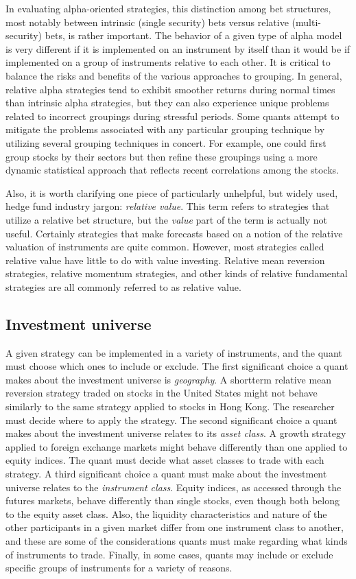\documentclass[11pt]{report}
\begin{document}
				In evaluating alpha-oriented strategies, this distinction among bet structures, most notably between intrinsic (single security) bets versus relative (multi-security) bets, is rather important. The behavior of a given type of alpha model is very different if it is implemented on an instrument by itself than it would be if implemented on a group of instruments relative to each other. It is critical to balance the risks and benefits of the various approaches to grouping. In general, relative alpha strategies tend to exhibit smoother returns during normal times than intrinsic alpha strategies, but they can also experience unique problems related to incorrect groupings during stressful periods. Some quants attempt to mitigate the problems associated with any particular grouping technique by utilizing several grouping techniques in concert. For example, one could first group stocks by their sectors but then refine these groupings using a more dynamic statistical approach that reflects recent correlations among the stocks.

				Also, it is worth clarifying one piece of particularly unhelpful, but widely used, hedge fund industry jargon: \textit{relative value}. This term refers to strategies that utilize a relative bet structure, but the \textit{value} part of the term is actually not useful. Certainly strategies that make forecasts based on a notion of the relative valuation of instruments are quite common. However, most strategies called relative value have little to do with value investing. Relative mean reversion strategies, relative momentum strategies, and other kinds of relative fundamental strategies are all commonly referred to as relative value.

			\subsection{Investment universe}

				A given strategy can be implemented in a variety of instruments, and the quant must choose which ones to include or exclude. The first significant choice a quant makes about the investment universe is \textit{geography}. A shortterm relative mean reversion strategy traded on stocks in the United States might not behave similarly to the same strategy applied to stocks in Hong Kong. The researcher must decide where to apply the strategy. The second significant choice a quant makes about the investment universe relates to its \textit{asset class}. A growth strategy applied to foreign exchange markets might behave differently than one applied to equity indices. The quant must decide what asset classes to trade with each strategy. A third significant choice a quant must make about the investment universe relates to the \textit{{instrument class}}. Equity indices, as accessed through the futures markets, behave differently than single stocks, even though both belong to the equity asset class. Also, the liquidity characteristics and nature of the other participants in a given market differ from one instrument class to another, and these are some of the considerations quants must make regarding what kinds of instruments to trade. Finally, in some cases, quants may include or exclude specific groups of instruments for a variety of reasons.
\end{document}
